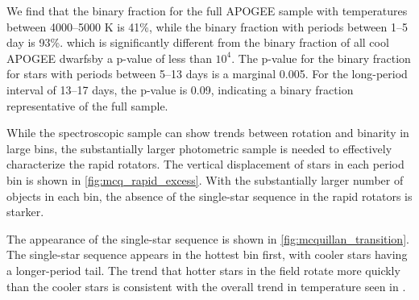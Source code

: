 \documentclass[manuscript]{aastex6}
\begin{document}
We find that the binary fraction for the full APOGEE sample with temperatures
between 4000--5000 K is 41\%,  while the binary fraction with periods 
between 1--5 day is 93\%. which
is significantly different from the binary fraction of all cool APOGEE dwarfsby a
p-value of less than \(10^4\). The p-value for the binary fraction for stars
with periods between 5--13 days is a marginal 0.005. For the long-period
interval of 13--17 days, the p-value is 0.09, indicating a binary fraction
representative of the full sample.

\begin{figure*}[htb]
    \centering
    \caption{\emph{Top Left to Bottom Right:} Vertical displacement of all 
        cool \citet{McQuillan14} targets in period bins \(> 13\) days, 
        \(5--13\) days, \(1--5\) days, and less than 1 day. Pink stars denote 
        eclipsing binaries with orbital periods within the same ranges. The 
        green and purple lines denote the inclusive and conservative 
        photometric binary thresholds, 
    respectively}\label{fig:mcq_rapid_excess}
\end{figure*}

While the spectroscopic sample can show trends between rotation and binarity in
large bins, the substantially larger photometric sample is needed to 
effectively characterize the rapid rotators. The vertical displacement of stars 
in each period bin is shown in \cref{fig:mcq_rapid_excess}. With the 
substantially larger number of objects in each bin, the absence of the
single-star sequence in the rapid rotators is starker.

\begin{figure*}[htb]
    \centering
    \caption{Same as \cref{fig:mcq_rapid_excess} except with the period ranges
    5--7 day, 7--9 day, 9--11 day, 11--13 days.}
    \label{fig:mcquillan_transition}
\end{figure*}

The appearance of the single-star sequence is shown in
\cref{fig:mcquillan_transition}. The single-star sequence appears in the
hottest bin first, with cooler stars having a longer-period tail. The trend
that hotter stars in the field rotate more quickly than the cooler stars 
is consistent with the overall trend in temperature seen in 
\citet{McQuillan14}.
\end{document}

